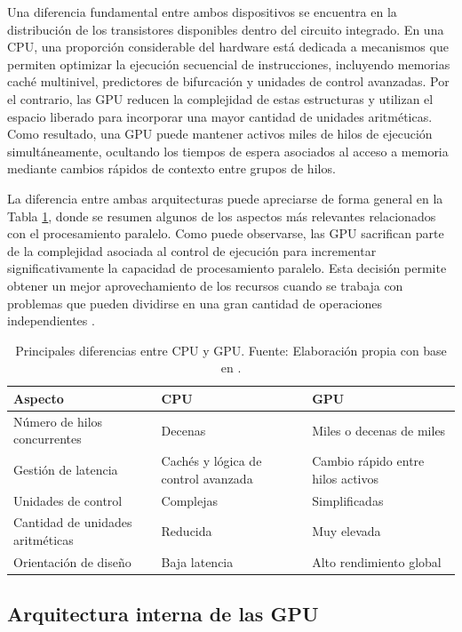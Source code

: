 Una diferencia fundamental entre ambos dispositivos se encuentra en la distribución de los transistores disponibles dentro del circuito integrado. En una CPU, una proporción considerable del hardware está dedicada a mecanismos que permiten optimizar la ejecución secuencial de instrucciones, incluyendo memorias caché multinivel, predictores de bifurcación y unidades de control avanzadas. Por el contrario, las GPU reducen la complejidad de estas estructuras y utilizan el espacio liberado para incorporar una mayor cantidad de unidades aritméticas. Como resultado, una GPU puede mantener activos miles de hilos de ejecución simultáneamente, ocultando los tiempos de espera asociados al acceso a memoria mediante cambios rápidos de contexto entre grupos de hilos.

La diferencia entre ambas arquitecturas puede apreciarse de forma general en la Tabla \ref{tab:diferencias_cpu_gpu}, donde se resumen algunos de los aspectos más relevantes relacionados con el procesamiento paralelo. Como puede observarse, las GPU sacrifican parte de la complejidad asociada al control de ejecución para incrementar significativamente la capacidad de procesamiento paralelo. Esta decisión permite obtener un mejor aprovechamiento de los recursos cuando se trabaja con problemas que pueden dividirse en una gran cantidad de operaciones independientes \cite{awsGPUCPU,investigacionCUDA}.

\begin{table}[H]
\centering
\caption{Principales diferencias entre CPU y GPU. Fuente: Elaboración propia con base en \cite{awsGPUCPU,investigacionCUDA}.}
\label{tab:diferencias_cpu_gpu}
\begin{tabular}{|p{4cm}|p{5cm}|p{5cm}|}
\hline
\textbf{Aspecto} & \textbf{CPU} & \textbf{GPU} \\
\hline
Número de hilos concurrentes & Decenas & Miles o decenas de miles \\
\hline
Gestión de latencia & Cachés y lógica de control avanzada & Cambio rápido entre hilos activos \\
\hline
Unidades de control & Complejas & Simplificadas \\
\hline
Cantidad de unidades aritméticas & Reducida & Muy elevada \\
\hline
Orientación de diseño & Baja latencia & Alto rendimiento global \\
\hline
\end{tabular}
\end{table}

\subsection{Arquitectura interna de las GPU}

